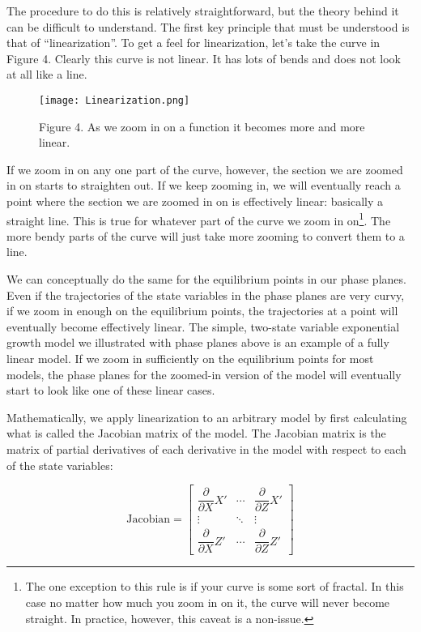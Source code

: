 \documentclass[]{memoir}
\let\Oldincludegraphics\includegraphics
\renewcommand{\includegraphics}[1]{\Oldincludegraphics[max size={\textwidth}{\textheight}]{#1}}
\begin{document}
The procedure to do this is relatively straightforward, but the theory
behind it can be difficult to understand. The first key principle that
must be understood is that of ``linearization''. To get a feel for
linearization, let's take the curve in Figure 4. Clearly this curve is
not linear. It has lots of bends and does not look at all like a line.

\begin{figure}[htbp]
\centering
\texttt{[image: Linearization.png]}
\caption{Figure 4. As we zoom in on a function it becomes more and more
linear.}
\end{figure}

If we zoom in on any one part of the curve, however, the section we are
zoomed in on starts to straighten out. If we keep zooming in, we will
eventually reach a point where the section we are zoomed in on is
effectively linear: basically a straight line. This is true for whatever
part of the curve we zoom in on\footnote{The one exception to this rule
  is if your curve is some sort of fractal. In this case no matter how
  much you zoom in on it, the curve will never become straight. In
  practice, however, this caveat is a non-issue.}. The more bendy parts
of the curve will just take more zooming to convert them to a line.

We can conceptually do the same for the equilibrium points in our phase
planes. Even if the trajectories of the state variables in the phase
planes are very curvy, if we zoom in enough on the equilibrium points,
the trajectories at a point will eventually become effectively linear.
The simple, two-state variable exponential growth model we illustrated
with phase planes above is an example of a fully linear model. If we
zoom in sufficiently on the equilibrium points for most models, the
phase planes for the zoomed-in version of the model will eventually
start to look like one of these linear cases.

Mathematically, we apply linearization to an arbitrary model by first
calculating what is called the Jacobian matrix of the model. The
Jacobian matrix is the matrix of partial derivatives of each derivative
in the model with respect to each of the state variables:

\[ \text{Jacobian} = \begin{bmatrix} \dfrac{\partial }{\partial X} X' & \cdots & \dfrac{\partial }{\partial Z} X' \\ \vdots & \ddots & \vdots \\ \dfrac{\partial }{\partial X} Z' & \cdots & \dfrac{\partial }{\partial Z} Z'  \end{bmatrix} \]
\end{document}

